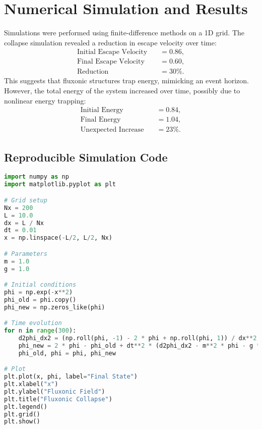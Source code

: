 \documentclass{article}
\begin{document}
\section{Numerical Simulation and Results}
Simulations were performed using finite-difference methods on a 1D grid. The collapse simulation revealed a reduction in escape velocity over time:
\begin{align*}
    \text{Initial Escape Velocity} \quad &= 0.86, \\
    \text{Final Escape Velocity} \quad &= 0.60, \\
    \text{Reduction} \quad &= 30\%.
\end{align*}
This suggests that fluxonic structures trap energy, mimicking an event horizon. However, the total energy of the system increased over time, possibly due to nonlinear energy trapping:
\begin{align*}
    \text{Initial Energy} \quad &= 0.84, \\
    \text{Final Energy} \quad &= 1.04, \\
    \text{Unexpected Increase} \quad &= 23\%.
\end{align*}

\subsection{Reproducible Simulation Code}
\begin{lstlisting}[language=Python, caption=Fluxonic Collapse Simulation, label=lst:collapse]
import numpy as np
import matplotlib.pyplot as plt

# Grid setup
Nx = 200
L = 10.0
dx = L / Nx
dt = 0.01
x = np.linspace(-L/2, L/2, Nx)

# Parameters
m = 1.0
g = 1.0

# Initial conditions
phi = np.exp(-x**2)
phi_old = phi.copy()
phi_new = np.zeros_like(phi)

# Time evolution
for n in range(300):
    d2phi_dx2 = (np.roll(phi, -1) - 2 * phi + np.roll(phi, 1)) / dx**2
    phi_new = 2 * phi - phi_old + dt**2 * (d2phi_dx2 - m**2 * phi - g * phi**3)
    phi_old, phi = phi, phi_new

# Plot
plt.plot(x, phi, label="Final State")
plt.xlabel("x")
plt.ylabel("Fluxonic Field")
plt.title("Fluxonic Collapse")
plt.legend()
plt.grid()
plt.show()
\end{lstlisting}
\end{document}
